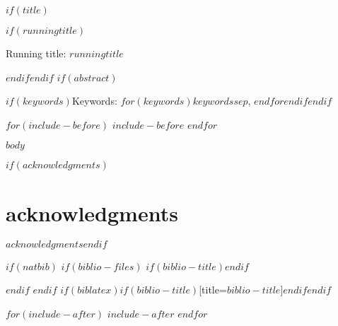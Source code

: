 \documentclass[$if(fontsize)$$fontsize$,$endif$$if(lang)$$lang$,$endif$$if(papersize)$$papersize$,$endif$$for(classoption)$$classoption$$sep$,$endfor$]{$documentclass$}
\affil{$for(author)$$author.email$$sep$, $endfor$}
\renewcommand{\refname}{\bfseries\large\uppercase{references}}
\begin{document}
\doublespacing
\raggedright

$if(title)$\maketitle$if(runningtitle)$\begin{center}Running title: $runningtitle$\end{center}$endif$\newpage$endif$
$if(abstract)$\begin{abstract}\noindent{}$abstract$\end{abstract}$if(keywords)$\bigskip\bigskip\bigskip Keywords: $for(keywords)$$keywords$$sep$, $endfor$$endif$\newpage$endif$

$for(include-before)$
$include-before$
$endfor$

$body$

\cleardoublepage

$if(acknowledgments)$\section*{acknowledgments}$acknowledgments$\cleardoublepage$endif$


$if(natbib)$
$if(biblio-files)$
$if(biblio-title)$\renewcommand\refname{$biblio-title$}$endif$

$endif$
$endif$
$if(biblatex)$\printbibliography$if(biblio-title)$[title=$biblio-title$]$endif$$endif$

\cleardoublepage
\listoffigures

$for(include-after)$
$include-after$
$endfor$

\end{document}
